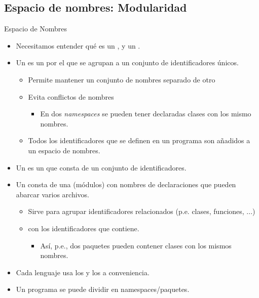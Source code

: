 \documentclass[10pt,envcountsect,spanish]{beamer}
\begin{document}
\subsection{Espacio de nombres: Modularidad}






\begin{frame}[label={spacename}]{Espacio de Nombres} 

\begin{itemize}
\item Necesitamos entender qué es un ,   y un .
\item Un  es un  por el que se agrupan a un conjunto de identificadores únicos. 
	\begin{itemize}
	\item Permite mantener un conjunto de nombres separado de otro
	\item Evita conflictos de nombres
	\begin{itemize}
	\item En dos \textit{namespaces} se pueden tener declaradas clases con los mismo nombres.
	\end{itemize}
	\item Todos los identificadores que se definen en un programa son añadidos a un espacio de nombres.
	\end{itemize}

\item Un  es un  que consta de un conjunto de identificadores. 
	
\item Un  consta de una  (módulos) con nombres de declaraciones que pueden abarcar varios archivos. 
	\begin{itemize}
	\item Sirve para agrupar identificadores relacionados (p.e. clases, funciones, ...)
	\item {} con los identificadores que contiene.
	\begin{itemize}
	\item Así, p.e., dos paquetes pueden contener clases con los mismos nombres.
	\end{itemize}
	\end{itemize}
	
\item Cada lenguaje usa los  y los   a conveniencia.
\item Un programa se puede dividir en namespaces/paquetes.
\end{itemize}

\end{frame}
\end{document}
